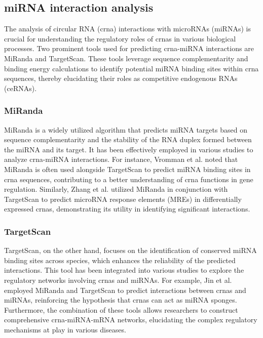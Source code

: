 \subsection{miRNA interaction analysis}
The analysis of circular RNA (\gls{crna}) interactions with microRNAs (miRNAs)
is crucial for understanding the regulatory roles of \gls{crna}s in various
biological processes.
Two prominent tools used for predicting \gls{crna}-miRNA interactions are
MiRanda and TargetScan.
These tools leverage sequence complementarity and binding energy calculations
to identify potential miRNA binding sites within \gls{crna} sequences, thereby
elucidating their roles as competitive endogenous RNAs (ceRNAs).

\subsubsection{MiRanda}
MiRanda is a widely utilized algorithm that predicts miRNA targets based on
sequence complementarity and the stability of the RNA duplex formed between the
miRNA and its target.
It has been effectively employed in various studies to analyze \gls{crna}-miRNA
interactions.
For instance, Vromman et al.
noted that
MiRanda is often used alongside TargetScan to predict miRNA binding sites in
\gls{crna} sequences, contributing to a better understanding of \gls{crna}
functions
in gene regulation\supercite{vromman_closing_2021}.
Similarly, Zhang et al.
utilized
MiRanda in conjunction with TargetScan to predict microRNA response elements
(MREs) in differentially expressed \gls{crna}s, demonstrating its utility in
identifying significant interactions\supercite{zhang_microarray_2017}.

\subsubsection{TargetScan}
TargetScan, on the other hand, focuses on the identification of conserved miRNA
binding sites across species, which enhances the reliability of the predicted
interactions.
This tool has been integrated into various studies to explore the regulatory
networks involving \gls{crna}s and miRNAs.
For example, Jin et al.
employed MiRanda and TargetScan to predict interactions between \gls{crna}s and
miRNAs, reinforcing the hypothesis that \gls{crna}s can act as miRNA
sponges\supercite{jin_changes_2018}.
Furthermore, the combination of these tools allows researchers to construct
comprehensive \gls{crna}-miRNA-mRNA networks, elucidating the complex
regulatory mechanisms at play in various
diseases\supercite{he_construction_2021,zhang_construction_2021}.
